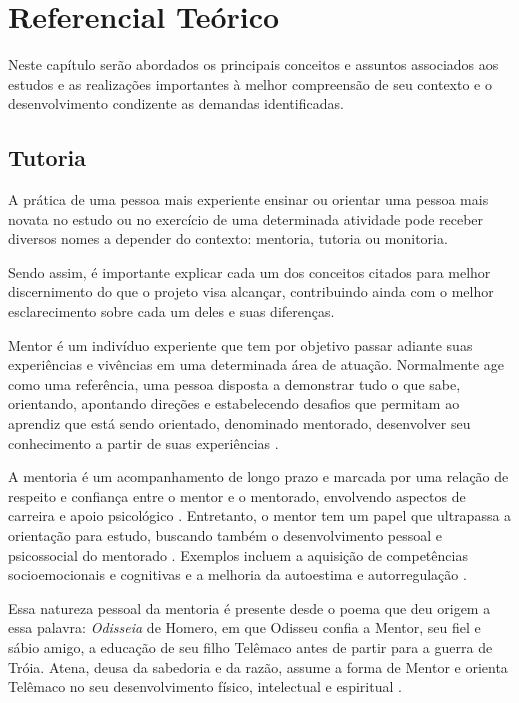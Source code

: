 \chapter[Referencial Teórico]{Referencial Teórico}
\label{cap:referencial}

Neste capítulo serão abordados os principais conceitos e assuntos associados aos estudos e as realizações importantes à melhor compreensão de seu contexto e o desenvolvimento condizente as demandas identificadas.

\section[Tutoria]{Tutoria}
\label{sec:tutoria}

A prática de uma pessoa mais experiente ensinar ou orientar uma pessoa mais novata no estudo ou no exercício de uma determinada atividade pode receber diversos nomes a depender do contexto: mentoria, tutoria ou monitoria.

Sendo assim, é importante explicar cada um dos conceitos citados para melhor discernimento do que o projeto visa alcançar, contribuindo ainda com o melhor esclarecimento sobre cada um deles e suas diferenças.

Mentor é um indivíduo experiente que tem por objetivo passar adiante suas experiências e vivências em uma determinada área de atuação. Normalmente age como uma referência, uma pessoa disposta a demonstrar tudo o que sabe, orientando, apontando direções e estabelecendo desafios que permitam ao aprendiz que está sendo orientado, denominado mentorado, desenvolver seu conhecimento a partir de suas experiências \cite{oliveira2020mentoria}.

A mentoria é um acompanhamento de longo prazo e marcada por uma relação de respeito e confiança entre o mentor e o mentorado, envolvendo aspectos de carreira e apoio psicológico \cite{oliveira2020mentoria}. Entretanto, o mentor tem um papel que ultrapassa a orientação para estudo, buscando também o desenvolvimento pessoal e psicossocial do mentorado \cite{botti2008preceptor}. Exemplos incluem a aquisição de competências socioemocionais e cognitivas e a melhoria da autoestima e autorregulação \cite{opp2024mentoria}.

Essa natureza pessoal da mentoria é presente desde o poema que deu origem a essa palavra: \textit{Odisseia} de Homero, em que Odisseu confia a Mentor, seu fiel e sábio amigo, a educação de seu filho Telêmaco antes de partir para a guerra de Tróia. Atena, deusa da sabedoria e da razão, assume a forma de Mentor e orienta Telêmaco no seu desenvolvimento físico, intelectual e espiritual \cite{semiao2009tutoria}.

